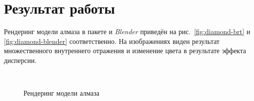 \documentclass[a4paper,10pt]{article}
\begin{document}
\section{Результат работы}
Рендеринг модели алмаза в пакете и \textit{Blender} приведён на рис.~\ref{fig:diamond-brt} и \ref{fig:diamond-blender} соответственно.
На изображениях виден результат множественного внутреннего отражения и изменение цвета в результате эффекта дисперсии.

\begin{figure}
  \centering
  \\
  \caption{Рендеринг модели алмаза}
  \label{fig:prism-test-results}
\end{figure}



\end{document}
